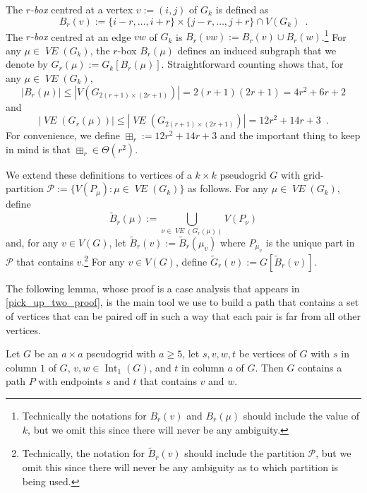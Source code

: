 \documentclass{patmorin}
\newcommand{\vol}[1]{\boxplus_{#1}}
\DeclareMathOperator{\interior}{Int}
\newcommand{\defin}[1]{\emph{\color{brightmaroon}#1}}
\DeclareMathOperator{\VE}{\mathit{VE}}
\begin{document}
The \defin{$r$-box} centred at a vertex $v:=(i,j)$ of $G_{k}$ is defined as
\[
  B_r(v) := \{i-r,\ldots,i+r\}\times\{j-r,\ldots,j+r\} \cap V(G_{k}) \enspace .
\]
The \defin{$r$-box} centred at an edge $vw$ of $G_{k}$ is $B_r(vw):=B_r(v)\cup B_r(w)$.\footnote{Technically the notations for $B_r(v)$ and $B_r(\mu)$ should include the value of $k$, but we omit this since there will never be any ambiguity.}
For any $\mu\in\VE(G_k)$, the $r$-box $B_r(\mu)$ defines an induced subgraph that we denote by $G_r(\mu):=G_{k}[B_r(\mu)]$.  Straightforward counting shows that, for any $\mu\in\VE(G_k)$,
\[
   |B_r(\mu)| \le |V(G_{2(r+1)\times (2r+1)})| = 2(r+1)(2r+1) = 4r^2+6r+2
\]
and
\begin{equation}
   |\VE(G_r(\mu))| \le |\VE(G_{2(r+1)\times (2r+1)})| = 12r^2+14r+3 \enspace . \label{rbox_size}
\end{equation}
For convenience, we define $\vol{r}:=12r^2+14r+3$ and the important thing to  keep in mind is that $\vol{r} \in\Theta(r^2)$.
%

We extend these definitions to vertices of a $k\times k$ pseudogrid $G$ with grid-partition $\mathcal{P}:=\{V(P_\mu):\mu\in\VE(G_k)\}$ as follows. For any $\mu\in\VE(G_k)$, define
\[
   \tilde{B}_r(\mu) := \bigcup_{\nu\in \VE(G_r(\mu))} V(P_\nu)
\]
and, for any $v\in V(G)$, let $\tilde{B}_r(v):=\tilde{B}_r(\mu_v)$ where $P_{\mu_v}$ is the unique part in $\mathcal{P}$ that contains $v$.\footnote{Technically, the notation for $\tilde{B}_r(v)$ should include the partition $\mathcal{P}$, but we omit this since there will never be any ambiguity as to which partition is being used.}
For any $v\in V(G)$, define $\tilde{G}_r(v):=G[\tilde{B}_r(v)]$.

The following lemma, whose proof is a case analysis that appears in \cref{pick_up_two_proof}, is the main tool we use to build a path that contains a set of vertices that can be paired off in such a way that each pair is far from all other vertices.

\begin{lem}[restate=pickuptwo,label=pick_up_two]
  Let $G$ be an $a\times a$ pseudogrid with $a\ge 5$,  let $s,v,w,t$ be vertices of $G$ with $s$ in column $1$ of $G$, $v,w\in \interior_1(G)$, and $t$ in column $a$ of $G$.  Then $G$ contains a path $P$ with endpoints $s$ and $t$ that contains $v$ and $w$.
\end{lem}
\end{document}
